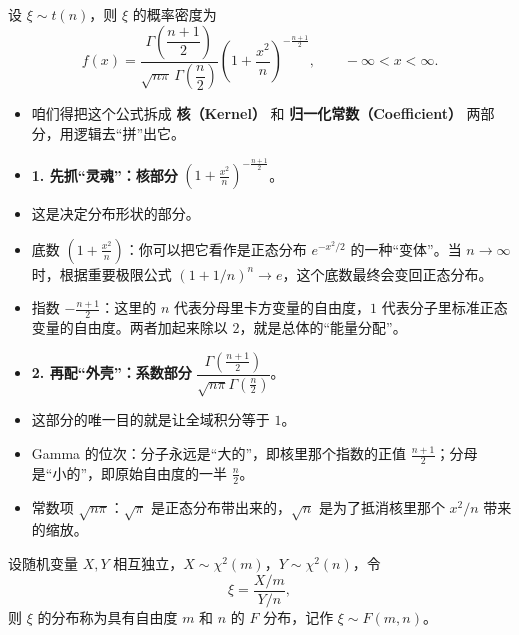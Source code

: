 \begin{theorem}
设 $\xi\sim t(n)$，则 $\xi$ 的概率密度为
\[
f(x)=\frac{\Gamma\!\left(\dfrac{n+1}{2}\right)}
{\sqrt{n\pi}\,\Gamma\!\left(\dfrac{n}{2}\right)}
\left(1+\frac{x^2}{n}\right)^{-\frac{n+1}{2}},
\qquad -\infty<x<\infty.
\]
\end{theorem}
\begin{dxtips}[$t$ 分布密度公式的拆解]
\begin{itemize}
    \item 咱们得把这个公式拆成 \textbf{核（Kernel）} 和 \textbf{归一化常数（Coefficient）} 两部分，用逻辑去“拼”出它。
    
    \item \textbf{1. 先抓“灵魂”：核部分} \(\left(1+\frac{x^2}{n}\right)^{-\frac{n+1}{2}}\)。

    \item 这是决定分布形状的部分。

    \item 底数 \(\left(1+\frac{x^2}{n}\right)\)：你可以把它看作是正态分布 \(e^{-x^2/2}\) 的一种“变体”。当 \(n\to\infty\) 时，根据重要极限公式 \((1+1/n)^n\to e\)，这个底数最终会变回正态分布。

    \item 指数 \(-\frac{n+1}{2}\)：这里的 \(n\) 代表分母里卡方变量的自由度，\(1\) 代表分子里标准正态变量的自由度。两者加起来除以 \(2\)，就是总体的“能量分配”。

    \item \textbf{2. 再配“外壳”：系数部分} \(\dfrac{\Gamma\left(\frac{n+1}{2}\right)}{\sqrt{n\pi}\Gamma\left(\frac{n}{2}\right)}\)。

    \item 这部分的唯一目的就是让全域积分等于 \(1\)。

    \item Gamma 的位次：分子永远是“大的”，即核里那个指数的正值 \(\frac{n+1}{2}\)；分母是“小的”，即原始自由度的一半 \(\frac{n}{2}\)。

    \item 常数项 \(\sqrt{n\pi}\)：\(\sqrt{\pi}\) 是正态分布带出来的，\(\sqrt{n}\) 是为了抵消核里那个 \(x^2/n\) 带来的缩放。
\end{itemize}
\end{dxtips}
\begin{definition}
设随机变量 $X,Y$ 相互独立，$X\sim \chi^2(m)$，$Y\sim \chi^2(n)$，令
\[
\xi=\frac{X/m}{Y/n},
\]
则 $\xi$ 的分布称为具有自由度 $m$ 和 $n$ 的 $F$ 分布，记作 $\xi\sim F(m,n)$。
\end{definition}
